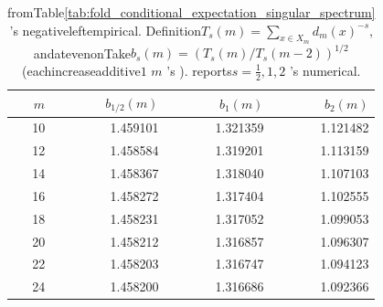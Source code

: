 \begin{table}[H]
\centering
\scriptsize
\setlength{\tabcolsep}{6pt}
\caption{fromTable\ref{tab:fold_conditional_expectation_singular_spectrum} 's negativeleftempirical. Definition$T_s(m)=\sum_{x\in X_m}d_m(x)^{-s}$, andatevenonTake$b_s(m)=(T_s(m)/T_s(m-2))^{1/2}$(eachincreaseadditive$1$ $m$ 's ). reports$s=\tfrac12,1,2$ 's numerical.}
\label{tab:fold_conditional_expectation_left_tail_bases}
\begin{tabular}{r r r r}
\toprule
$m$ & $b_{1/2}(m)$ & $b_{1}(m)$ & $b_{2}(m)$\\
\midrule
10 & 1.459101 & 1.321359 & 1.121482\\
12 & 1.458584 & 1.319201 & 1.113159\\
14 & 1.458367 & 1.318040 & 1.107103\\
16 & 1.458272 & 1.317404 & 1.102555\\
18 & 1.458231 & 1.317052 & 1.099053\\
20 & 1.458212 & 1.316857 & 1.096307\\
22 & 1.458203 & 1.316747 & 1.094123\\
24 & 1.458200 & 1.316686 & 1.092366\\
\bottomrule
\end{tabular}
\end{table}

